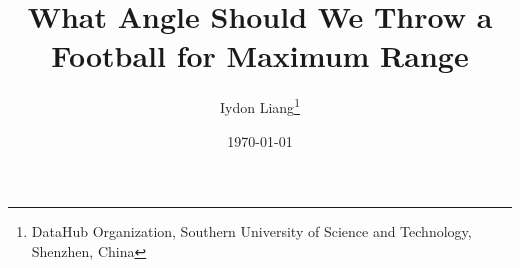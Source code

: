 \title{What Angle Should We Throw a Football for Maximum Range}
\author{Iydon Liang\footnote{DataHub Organization, Southern University of Science and Technology, Shenzhen, China}}
\date{\today}
\newcommand{\qepath}{sections/quadratic_equation}


\maketitle

\tableofcontents\clearpage



\clearpage
\clearpage
\clearpage

